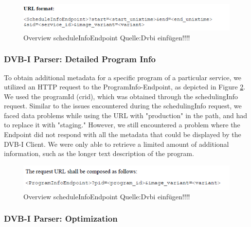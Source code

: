 \documentclass[conference]{IEEEtran}
\begin{document}
\begin{figure}[ht]
	\centerline{\includegraphics[width=\linewidth]{figures/scheduleInfoEndpointTime}}
	\caption{Overview scheduleInfoEndpoint Quelle:Dvbi einfügen!!!!}
	\label{fig:scheduleInfoEndpoint}
\end{figure}



\subsubsection{DVB-I Parser: Detailed Program Info }



To obtain additional metadata for a specific program of a particular service, we utilized an HTTP request to the ProgramInfo-Endpoint, as depicted in Figure \ref{fig:programInfoEndpoint}. We used the programId (crid), which was obtained through the schedulingInfo request. Similar to the issues encountered during the schedulingInfo request, we faced data problems while using the URL with "production" in the path, and had to replace it with "staging." However, we still encountered a problem where the Endpoint did not respond with all the metadata that could be displayed by the DVB-I Client. We were only able to retrieve a limited amount of additional information, such as the longer text description of the program.



\begin{figure}[ht]
	\centerline{\includegraphics[width=\linewidth]{figures/programInfoEndpoint}}
	\caption{Overview scheduleInfoEndpoint Quelle:Dvbi einfügen!!!!}
	\label{fig:programInfoEndpoint}
\end{figure}


\subsubsection{DVB-I Parser: Optimization}\label{dvbi opt}
\end{document}
